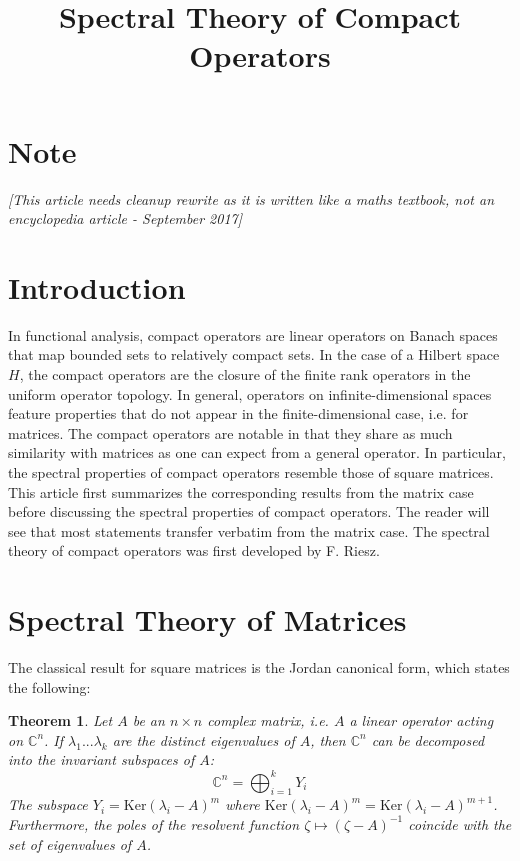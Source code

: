 \documentclass{article}
\title{Spectral Theory of Compact Operators}
\author{}
\date{}
\newtheorem{theorem}{Theorem}
\theoremstyle{definition}
\begin{document}
\maketitle

\section*{Note}
\textit{[This article needs cleanup rewrite as it is written like a maths textbook, not an encyclopedia article - September 2017]}

\section{Introduction}
In functional analysis, compact operators are linear operators on Banach spaces that map bounded sets to relatively compact sets. In the case of a Hilbert space $H$, the compact operators are the closure of the finite rank operators in the uniform operator topology. In general, operators on infinite-dimensional spaces feature properties that do not appear in the finite-dimensional case, i.e. for matrices. The compact operators are notable in that they share as much similarity with matrices as one can expect from a general operator. In particular, the spectral properties of compact operators resemble those of square matrices. This article first summarizes the corresponding results from the matrix case before discussing the spectral properties of compact operators. The reader will see that most statements transfer verbatim from the matrix case. The spectral theory of compact operators was first developed by F. Riesz.

\section{Spectral Theory of Matrices}
The classical result for square matrices is the Jordan canonical form, which states the following:

\begin{theorem}
Let $A$ be an $n \times n$ complex matrix, i.e. $A$ a linear operator acting on $\mathbb{C}^n$. If $\lambda_1...\lambda_k$ are the distinct eigenvalues of $A$, then $\mathbb{C}^n$ can be decomposed into the invariant subspaces of $A$:
\[\mathbb{C}^n = \bigoplus_{i=1}^k Y_i\]
The subspace $Y_i = \text{Ker}(\lambda_i - A)^m$ where $\text{Ker}(\lambda_i - A)^m = \text{Ker}(\lambda_i - A)^{m+1}$. Furthermore, the poles of the resolvent function $\zeta \mapsto (\zeta - A)^{-1}$ coincide with the set of eigenvalues of $A$.
\end{theorem}
\end{document}
